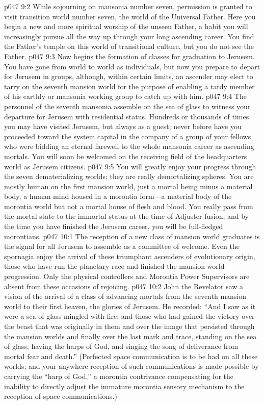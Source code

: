 \vs p047 9:2 While sojourning on mansonia number seven, permission is granted to visit transition world number seven, the world of the Universal Father. Here you begin a new and more spiritual worship of the unseen Father, a habit you will increasingly pursue all the way up through your long ascending career. You find the Father’s temple on this world of transitional culture, but you do not see the Father.
\pc \vs p047 9:3 Now begins the formation of classes for graduation to Jerusem. You have gone from world to world as individuals, but now you prepare to depart for Jerusem in groups, although, within certain limits, an ascender may elect to tarry on the seventh mansion world for the purpose of enabling a tardy member of his earthly or mansonia working group to catch up with him.
\vs p047 9:4 The personnel of the seventh mansonia assemble on the sea of glass to witness your departure for Jerusem with residential status. Hundreds or thousands of times you may have visited Jerusem, but always as a guest; never before have you proceeded toward the system capital in the company of a group of your fellows who were bidding an eternal farewell to the whole mansonia career as ascending mortals. You will soon be welcomed on the receiving field of the headquarters world as Jerusem citizens.
\pc \vs p047 9:5 You will greatly enjoy your progress through the seven dematerializing worlds; they are really demortalizing spheres. You are mostly human on the first mansion world, just a mortal being minus a material body, a human mind housed in a morontia form---a material body of the morontia world but not a mortal house of flesh and blood. You really pass from the mortal state to the immortal status at the time of Adjuster fusion, and by the time you have finished the Jerusem career, you will be full\hyp{}fledged morontians.
\vs p047 10:1 The reception of a new class of mansion world graduates is the signal for all Jerusem to assemble as a committee of welcome. Even the spornagia enjoy the arrival of these triumphant ascenders of evolutionary origin, those who have run the planetary race and finished the mansion world progression. Only the physical controllers and Morontia Power Supervisors are absent from these occasions of rejoicing.
\pc \vs p047 10:2 John the Revelator saw a vision of the arrival of a class of advancing mortals from the seventh mansion world to their first heaven, the glories of Jerusem. He recorded: “And I saw as it were a sea of glass mingled with fire; and those who had gained the victory over the beast that was originally in them and over the image that persisted through the mansion worlds and finally over the last mark and trace, standing on the sea of glass, having the harps of God, and singing the song of deliverance from mortal fear and death.” (Perfected space communication is to be had on all these worlds; and your anywhere reception of such communications is made possible by carrying the “harp of God,” a morontia contrivance compensating for the inability to directly adjust the immature morontia sensory mechanism to the reception of space communications.)
